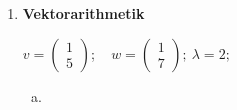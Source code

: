 \documentclass[10pt,ngerman]{scrartcl}
\begin{document}
\begin{enumerate}[1.]
~\newpage
	
\item \textbf{Vektorarithmetik}
	    ~\newline~
	    
	    \begin{math}v =	\begin{pmatrix}1 \\ 5\end{pmatrix}\end{math}; ~ \begin{math}w =	\begin{pmatrix}1 \\ 7\end{pmatrix};  ~  \lambda = 2; \end{math} 
	    
	\begin{enumerate}[(a)]
	\item
	

\end{enumerate}
\end{enumerate}
\end{document}
